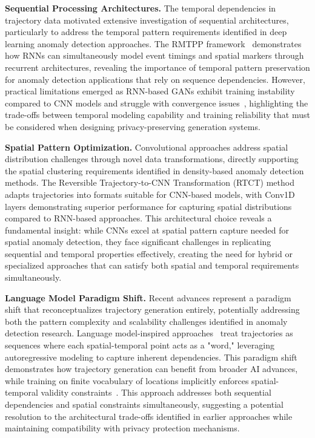 \documentclass[runningheads]{llncs}
\begin{document}
\textbf{Sequential Processing Architectures.} The temporal dependencies in trajectory data motivated extensive investigation of sequential architectures, particularly to address the temporal pattern requirements identified in deep learning anomaly detection approaches. The RMTPP framework~\cite{du2016recurrent} demonstrates how RNNs can simultaneously model event timings and spatial markers through recurrent architectures, revealing the importance of temporal pattern preservation for anomaly detection applications that rely on sequence dependencies. However, practical limitations emerged as RNN-based GANs exhibit training instability compared to CNN models and struggle with convergence issues~\cite{merhi2024synthetic}, highlighting the trade-offs between temporal modeling capability and training reliability that must be considered when designing privacy-preserving generation systems.

\textbf{Spatial Pattern Optimization.} Convolutional approaches address spatial distribution challenges through novel data transformations, directly supporting the spatial clustering requirements identified in density-based anomaly detection methods. The Reversible Trajectory-to-CNN Transformation (RTCT) method~\cite{merhi2024synthetic} adapts trajectories into formats suitable for CNN-based models, with Conv1D layers demonstrating superior performance for capturing spatial distributions compared to RNN-based approaches. This architectural choice reveals a fundamental insight: while CNNs excel at spatial pattern capture needed for spatial anomaly detection, they face significant challenges in replicating sequential and temporal properties effectively, creating the need for hybrid or specialized approaches that can satisfy both spatial and temporal requirements simultaneously.

\textbf{Language Model Paradigm Shift.} Recent advances represent a paradigm shift that reconceptualizes trajectory generation entirely, potentially addressing both the pattern complexity and scalability challenges identified in anomaly detection research. Language model-inspired approaches~\cite{zhang2025end} treat trajectories as sequences where each spatial-temporal point acts as a "word," leveraging autoregressive modeling to capture inherent dependencies. This paradigm shift demonstrates how trajectory generation can benefit from broader AI advances, while training on finite vocabulary of locations implicitly enforces spatial-temporal validity constraints~\cite{kong2023mobility}. This approach addresses both sequential dependencies and spatial constraints simultaneously, suggesting a potential resolution to the architectural trade-offs identified in earlier approaches while maintaining compatibility with privacy protection mechanisms.
\end{document}
